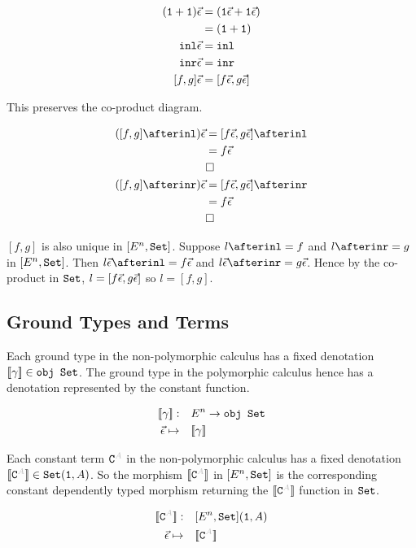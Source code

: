 \documentclass{report}
\begin{document}
\begin{align*}
    (\texttt{1} + \texttt{1})\vec{\epsilon} & = (\texttt{1}\vec{\epsilon} + \texttt{1}\vec{\epsilon})\\
    & = (\texttt{1} + \texttt{1})\\
    \texttt{inl}\vec{\epsilon} &= \texttt{inl}\\
    \texttt{inr}\vec{\epsilon} &= \texttt{inr}\\
    [f, g]\vec{\epsilon} &= [f\vec{\epsilon}, g\vec{\epsilon}]\\
\end{align*}

This preserves the co-product diagram.

\begin{align*}
    ([f, g]\after\inl)\ev & = [f\ev, g\ev]\after \inl\\
    & = f\ev\\
    & \square\\
    ([f, g]\after\inr)\ev& = [f\ev, g\ev]\after \inr\\
    & = f\ev\\
    & \square\\
\end{align*}

$[f, g]$ is also unique in $[E^n, \texttt{Set}]$. Suppose $l \after \inl = f$ and $l\after \inr = g$ in $[E^n, \texttt{Set}]$. Then $l\ev \after \inl = f\ev$ and $l\ev \after\inr = g\ev$. Hence by the co-product in $\texttt{Set}$, $l = [f\vec{\epsilon}, g\vec{\epsilon}]$ so $l = [f, g]$.


\subsection{Ground Types and Terms}
Each ground type in the non-polymorphic calculus has a fixed denotation ${\bf [\![}\gamma{\bf ]\!]}\in\texttt{obj }\texttt{Set}$. The ground type in the polymorphic calculus hence has a denotation represented by the constant function.

\begin{align*}
    {\bf [\![}\gamma{\bf ]\!]}:&\quad E^n\rightarrow \texttt{obj }\texttt{Set}\\
    \vec{\epsilon} \mapsto&\quad  {\bf [\![}\gamma{\bf ]\!]}\\
\end{align*}

Each constant term $\const{A}$ in the non-polymorphic calculus has a fixed denotation $\deno{\const{A}}\in\set(\1, A)$. So the morphism $\deno{\const{A}}$ in $[E^n, \texttt{Set}]$ is the corresponding constant dependently typed morphism returning the $\deno{\const{A}}$ function in $\texttt{Set}$.

\begin{align*}
    \deno{\const{A}}:&\quad[E^n, \set](\1, A)\\
    \ev\mapsto&\quad\deno{\const{A}}
\end{align*}
\end{document}
